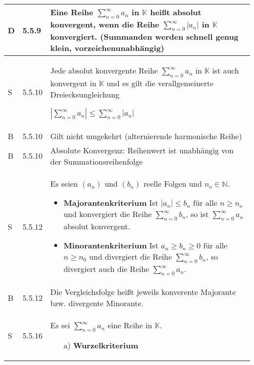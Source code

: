     \begin{longtable}{p{0.75cm} p{1cm} p{16cm}}
        \toprule

        D   & 5.5.9 &   Eine Reihe $\sum^{\infty}_{n=0} a_n$ in $\mathbb{K}$ heißt \textbf{absolut konvergent}, wenn die Reihe
                        $\sum^{\infty}_{n=0} |a_n|$ in $\mathbb{K}$ konvergiert. (Summanden werden schnell genug klein, vorzeichenunabhängig)\\
        \midrule
        S   & 5.5.10&   Jede absolut konvergente Reihe $\sum^{\infty}_{n=0} a_n$ in $\mathbb{K}$ ist auch konvergent in $\mathbb{K}$ und es
                        gilt die verallgemeinerte Dreiecksungleichung \hfill \break
                        \centerline{$|\sum^{\infty}_{n=0}a_n| \leq \sum^{\infty}_{n=0} |a_n|$} \\
        \midrule
        B   & 5.5.10&   Gilt nicht umgekehrt (alternierende harmonische Reihe)  \\
        \midrule
        B   & 5.5.10&   Absolute Konvergenz: Reihenwert ist unabhängig von der Summationsreihenfolge \\
        \midrule
        S   & 5.5.12&   Es seien $(a_n)$ und $(b_n)$ reelle Folgen und $n_o \in \mathbb{N}$.
                        \begin{itemize}[topsep=-0.5cm]
                            \item \textbf{Majorantenkriterium} \hfill \break 
                                    Ist $|a_n| \leq b_n$ für alle $n \geq n_o$ und konvergiert die Reihe $\sum^{\infty}_{n=0}b_n$, so ist
                                    $\sum^{\infty}_{n=0} a_n$ absolut konvergent.
                            \item \textbf{Minorantenkriterium} \hfill \break
                                    Ist $a_n \geq b_n \geq 0$ für alle $n \geq n_0$ und divergiert die Reihe $\sum^{\infty}_{n=0}b_n$, so 
                                    divergiert auch die Reihe $\sum^{\infty}_{n=0}a_n$. 
                        \end{itemize} \vspace{-0cm} \\
        \midrule
        B   & 5.5.12&   Die Vergleichsfolge heißt jeweils konverente Majorante bzw. divergente Minorante. \\
        \midrule
        S   & 5.5.16&   Es sei $\sum^{\infty}_{n=0}a_n$ eine Reihe in $\mathbb{K}$.
                        \begin{itemize}[topsep=-0.5cm]
                            \item[a)] \textbf{Wurzelkriterium} \hfill \break

\end{itemize}
\end{longtable}
